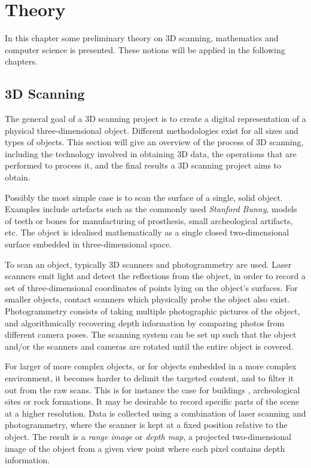 \chapter{Theory} \label{ch:theory}
In this chapter some preliminary theory on 3D scanning, mathematics and computer science is presented. These notions will be applied in the following chapters.

\section{3D Scanning}
The general goal of a 3D scanning project is to create a digital representation of a physical three-dimensional object. Different methodologies exist for all sizes and types of objects. This section will give an overview of the process of 3D scanning, including the technology involved in obtaining 3D data, the operations that are performed to process it, and the final results a 3D scanning project aims to obtain.

Possibly the most simple case is to scan the surface of a single, solid object. Examples include artefacts such as the commonly used \emph{Stanford Bunny}, models of teeth or bones for manufacturing of prosthesis, small archeological artifacts, etc. The object is idealised mathematically as a single closed two-dimensional surface embedded in three-dimensional space.

To scan an object, typically 3D scanners and photogrammetry are used. Laser scanners emit light and detect the reflections from the object, in order to record a set of three-dimensional coordinates of points lying on the object's surfaces. For smaller objects, contact scanners which physically probe the object also exist. Photogrammetry consists of taking multiple photographic pictures of the object, and algorithmically recovering depth information by comparing photos from different camera poses. The scanning system can be set up such that the object and/or the scanners and cameras are rotated until the entire object is covered.

For larger of more complex objects, or for objects embedded in a more complex environment, it becomes harder to delimit the targeted content, and to filter it out from the raw scans. This is for instance the case for buildings \cite{Kers2006}, archeological sites \cite{Web1} \cite{Kein2011} \cite{Grus2012} or rock formations. It may be desirable to record specific parts of the scene at a higher resolution. Data is collected using a combination of laser scanning and photogrammetry, where the scanner is kept at a fixed position relative to the object. The result is a \emph{range image} or \emph{depth map}, a projected two-dimensional image of the object from a given view point where each pixel contains depth information.

